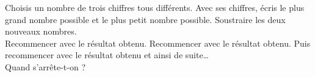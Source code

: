 Choisis  un  nombre  de  trois  chiffres  tous  différents.  Avec  ses
chiffres, écris le plus grand  nombre possible et le plus petit nombre
possible. Soustraire les deux nouveaux nombres. 
\\Recommencer avec  le résultat  obtenu. Recommencer avec  le résultat
obtenu.  Puis  recommencer  avec   le  résultat  obtenu  et  ainsi  de
suite\ldots
\\Quand s'arrête-t-on ?